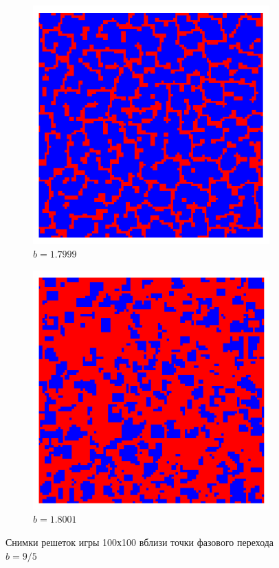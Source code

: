 \documentclass[a4paper]{article}
\begin{document}
\begin{figure}[H]
		\begin{subfigure}{.5\textwidth}
			\includegraphics[width=1\linewidth]{g1.7999.png}
			\caption{$b=1.7999$}
			\label{grid_left}			
		\end{subfigure}%
		\begin{subfigure}{.5\textwidth}
			\includegraphics[width=1\linewidth]{g1.8001.png}
			\caption{$b=1.8001$}
			\label{grid_right}			
		\end{subfigure}%
		\caption{Снимки решеток игры 100х100 вблизи точки фазового перехода $b=9/5$}
		\label{fig_exmpl}
	\end{figure}
		
\end{document}
